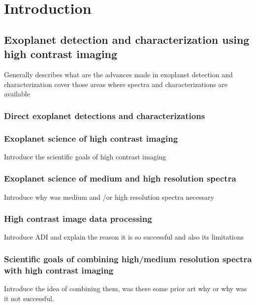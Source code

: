 \part{Introduction}

\startcontents[chapters]
\printmyminitoc{
}

\nopagebreak

\chapter{Exoplanet detection and characterization using high contrast imaging}
Generally describes what are the advances made in exoplanet detection and characterization
cover those areas where spectra and characterizations are available
\section{Direct exoplanet detections and characterizations}
\section{Exoplanet science of high contrast imaging}
Introduce the scientific goals of high contrast imaging
\section{Exoplanet science of medium and high resolution spectra }
Introduce why was medium and /or high resolution spectra necessary
\section{High contrast image data processing}
Introduce ADI and explain the reason it is so successful and also its limitations
\section{Scientific goals of combining high/medium resolution spectra with high contrast imaging}
Introduce the idea of combining them, was there some prior art why or why was it not successful.


